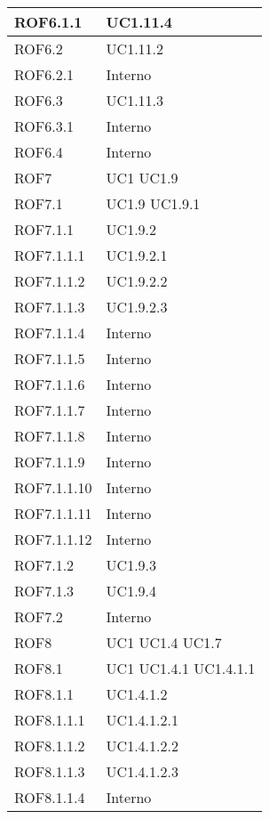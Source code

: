 \begin{center}
\begin{longtable}{| p{4cm} | p{4cm} |}
\hline
ROF6.1.1   &  UC1.11.4 \\
\hline
ROF6.2   &  UC1.11.2 \\
\hline
ROF6.2.1   &  Interno \\
\hline
ROF6.3   &  UC1.11.3 \\
\hline
ROF6.3.1   &  Interno \\
\hline
ROF6.4   &  Interno \\
\hline
ROF7   &  UC1 \newline UC1.9 \\
\hline
ROF7.1   &  UC1.9 \newline UC1.9.1 \\
\hline
ROF7.1.1   &  UC1.9.2  \\
\hline
ROF7.1.1.1   &  UC1.9.2.1 \\
\hline
ROF7.1.1.2   &  UC1.9.2.2 \\
\hline
ROF7.1.1.3   &  UC1.9.2.3 \\
\hline
ROF7.1.1.4   &  Interno \\
\hline
ROF7.1.1.5   &  Interno \\
\hline
ROF7.1.1.6   &  Interno \\
\hline
ROF7.1.1.7   &  Interno \\
\hline
ROF7.1.1.8   &  Interno \\
\hline
ROF7.1.1.9   &  Interno \\
\hline
ROF7.1.1.10   &  Interno \\
\hline
ROF7.1.1.11   &  Interno \\
\hline
ROF7.1.1.12   &  Interno \\
\hline
ROF7.1.2   &  UC1.9.3  \\
\hline
ROF7.1.3   &  UC1.9.4  \\
\hline
ROF7.2   &  Interno \\
\hline
ROF8   &  UC1 \newline UC1.4 \newline UC1.7 \\
\hline
ROF8.1   &  UC1 \newline UC1.4.1 \newline UC1.4.1.1 \\
\hline
ROF8.1.1   &  UC1.4.1.2 \\
\hline
ROF8.1.1.1   &  UC1.4.1.2.1 \\
\hline
ROF8.1.1.2   &  UC1.4.1.2.2 \\
\hline
ROF8.1.1.3   &  UC1.4.1.2.3 \\
\hline
ROF8.1.1.4   &  Interno \\
\hline

\end{longtable}
\end{center}
